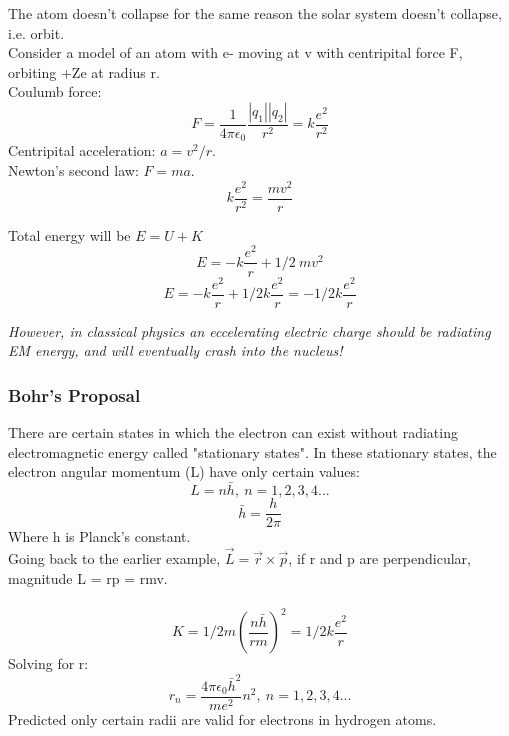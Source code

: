 \documentclass[class=article,crop=false]{standalone}
\begin{document}
The atom doesn't collapse for the same reason the solar system doesn't collapse, i.e. orbit. \\

Consider a model of an atom with e- moving at v with centripital force F, orbiting +Ze at radius r.\\
Coulumb force:
$$ F = \frac{1}{4\pi\epsilon_0}\frac{|q_1||q_2|}{r^2} = k \frac{e^2}{r^2} $$
Centripital acceleration: $a = v^2/r$. \\
Newton's second law: $F = ma$.\\
$$ k \frac{e^2}{r^2} = \frac{mv^2}{r} $$

Total energy will be $E = U + K$
$$ E = -k \frac{e^2}{r} + 1/2\ mv^2 $$ 
$$ E = -k \frac{e^2}{r} + 1/2 k \frac{e^2}{r} = -1/2 k \frac{e^2}{r} $$ 

\emph{However, in classical physics an eccelerating electric charge should be radiating EM energy, and will eventually crash into the nucleus!}

\subsubsection{Bohr's Proposal}
There are certain states in which the electron can exist without radiating electromagnetic energy called "stationary states". In these stationary states, the electron angular momentum (L) have only certain values:
$$ L = n \bar{h},\ n=1,2,3,4... $$
$$\bar{h} = \frac{h}{2\pi} $$ Where h is Planck's constant.\\
\smallskip
Going back to the earlier example, $\overrightarrow{L} = \vec{r} \times \vec{p}$, if r and p are perpendicular, magnitude L = rp = rmv.\\\\
$$ K = 1/2 m \left( \frac{n\bar{h}}{rm}\right)^2 = 1/2 k \frac{e^2}{r} $$
Solving for r:
$$r_n = \frac{4\pi\epsilon_0\bar{h}^2}{me^2} n^2,\ n=1,2,3,4... $$
Predicted only certain radii are valid for electrons in hydrogen atoms.
\end{document}
